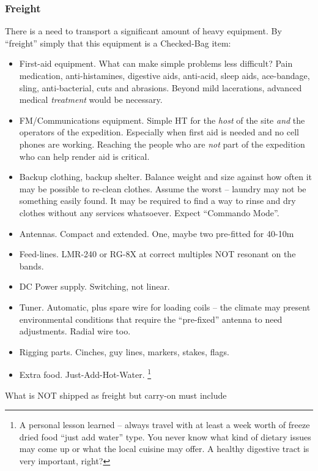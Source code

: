 \documentclass[11pt]{article}
\begin{document}
\subsubsection{Freight}

There is a need to transport a significant amount of heavy
equipment.  By ``freight'' simply that this equipment is 
a Checked-Bag item:

\begin{itemize}
\item First-aid equipment.  What can make simple problems less difficult?
Pain medication, anti-histamines, digestive aids,  anti-acid,
sleep aids, ace-bandage, sling,
anti-bacterial, cuts and abrasions.  Beyond mild lacerations, advanced
medical {\textit{treatment}} would be necessary.
\item FM/Communications equipment.  Simple HT for the {\textit{host}}
of the site {\textit{and}} the operators of the expedition.  Especially
when first aid is needed and no cell phones are working.  Reaching
the people who are {\textit{not}} part of the expedition who can help
render aid is critical.
\item Backup clothing, backup shelter.  Balance weight and size against
how often it may be possible to re-clean clothes.  Assume the worst --
laundry may not be something easily found.  It may be required to 
find a way to rinse and dry clothes without any services whatsoever.  Expect
``Commando Mode''.
\item Antennas. Compact and extended.  One, maybe two pre-fitted for 40-10m
\item Feed-lines. LMR-240 or RG-8X at correct multiples NOT resonant on
the bands.
\item DC Power supply. Switching, not linear.
\item Tuner. Automatic, plus spare wire for loading coils -- the climate
may present environmental conditions that require the ``pre-fixed'' antenna
to need adjustments.  Radial wire too.
\item Rigging parts. Cinches, guy lines, markers, stakes, flags.
\item Extra food. Just-Add-Hot-Water. \footnote{A personal lesson learned -- 
always travel with
at least a week worth of freeze dried food ``just add water'' type.
You never know what kind of dietary issues may come up or what
the local cuisine may offer.  A healthy digestive tract is very important,
right?}
\end{itemize}

What is NOT shipped as freight but carry-on must include
\end{document}
